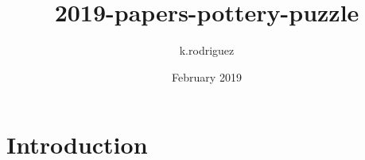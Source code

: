 \documentclass{article}
\title{2019-papers-pottery-puzzle}
\author{k.rodriguez }
\date{February 2019}
\begin{document}
\maketitle

\section{Introduction}
\end{document}
